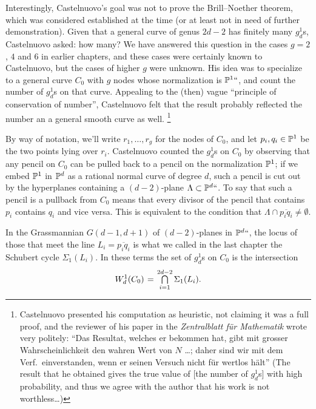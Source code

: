 Interestingly, Castelnuovo's goal was not to prove the Brill--Noether
theorem, which was considered established at the time (or at least not
in need of further demonstration). Given that
a general curve of genus $2d-2$ has finitely many $g^{1}_{d}$s,
Castelnuovo asked: how many? We have answered this question in
the
cases $g = 2$, $4$ and 6 in earlier chapters,
and these cases were certainly known to Castelnuovo,
but the cases of higher $g$ were unknown.
His idea was to specialize to a general curve $C_0$ with $g$ nodes
whose normalization is ${\mathbb P}^1` `$, and count the number of $g^1_d$s on
that curve. Appealing to the (then) vague ``principle of conservation
%
of number'', Castelnuovo felt that the result probably reflected the
number an a general smooth curve as well.%
%
\footnote{Castelnuovo
  presented his computation as heuristic, not claiming it was a full
  proof, and the reviewer of
his
paper in the \textit{Zentralblatt
f\"ur Mathematik}
%
wrote very politely:
``Das Resultat, welches er bekommen hat, gibt mit grosser
Wahrscheinlichkeit den wahren Wert von $N$ \dots; daher sind wir mit dem
Verf.\ einverstanden, wenn er seinen Versuch nicht f\"ur wertlos h\"alt''
(The result that he obtained gives the true value of [the number of
$g^1_d$s] with high probability, and thus we agree with the author that
his work is not worthless\dots)}

By way of notation, we'll write $r_1,\dots,r_g$ for the nodes of
$C_0$, and let $p_i, q_i \in {\mathbb P}^1$ be the two points lying over $r_i$.
Castelnuovo counted the $g^1_d$s on $C_0$ by observing that any pencil
on $C_0$ can be pulled back to a pencil on the normalization ${\mathbb P}^1$;
if we embed ${\mathbb P}^1$ in ${\mathbb P}^d$ as a
rational normal curve
%
of degree $d$, such a pencil is cut out by the hyperplanes containing
 a $(d-2)$-plane $\Lambda \subset {\mathbb P}^d``$.
To say that such a pencil is a pullback from $C_0$ means that every
divisor of the pencil that contains $p_i$ contains $q_i$ and vice
versa. This  is equivalent to the condition that $\Lambda \cap
\overline{p_iq_i} \neq \emptyset$.

In the Grassmannian $G(d-1, d+1)$ of $(d-2)$-planes in ${\mathbb P}^d``$,
the locus of those that meet the line $L_i = \overline{p_iq_i}$ is
what we called in the last chapter the Schubert cycle $\Sigma_1(L_i)$.
In these terms the set of $g^1_d$s on $C_0$ is the intersection
$$
W^1_d(C_0) \; = \; \tsty\bigcap\limits_{i=1}^{2d-2} \Sigma_1(L_i).
$$

